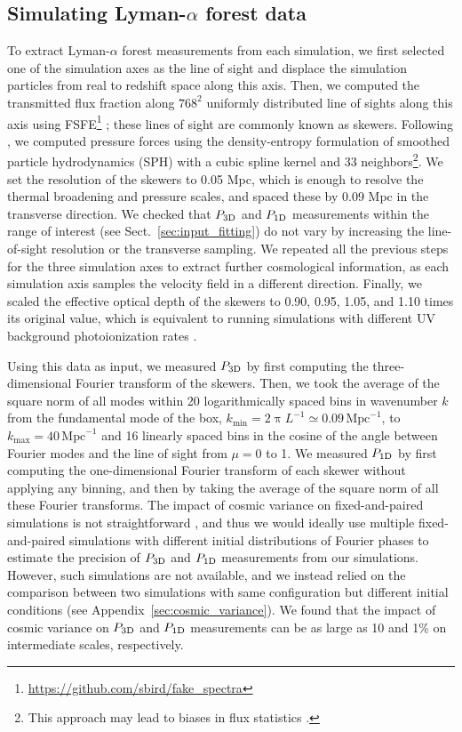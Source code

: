 \documentclass[longauth]{aa}
\newcommand{\lyaf}{Lyman-$\alpha$ forest\xspace}
\newcommand{\poned}{\ensuremath{P_{\rm 1D}}\xspace}
\newcommand{\pthreed}{\ensuremath{P_{\rm 3D}}\xspace}
\newcommand{\iMpc}{\ensuremath{\,\mathrm{Mpc}^{-1}}}
\begin{document}

\subsection{Simulating \lyaf data}
\label{sec:input_extract_lya}

To extract \lyaf measurements from each simulation, we first selected one of the simulation axes as the line of sight and displace the simulation particles from real to redshift space along this axis. Then, we computed the transmitted flux fraction along $768^2$ uniformly distributed line of sights along this axis using \textsc{FSFE}\footnote{\url{https://github.com/sbird/fake_spectra}} \citep{bird2017FSFEFakeSpectra}; these lines of sight are commonly known as skewers. Following \citet{Gadget_Springel}, we computed pressure forces using the density-entropy formulation of smoothed particle hydrodynamics (SPH) with a cubic spline kernel and 33 neighbors\footnote{This approach may lead to biases in flux statistics \citep{hydro_Chabanier2023}.}. We set the resolution of the skewers to 0.05 Mpc, which is enough to resolve the thermal broadening and pressure scales, and spaced these by 0.09 Mpc in the transverse direction. We checked that \pthreed and \poned measurements within the range of interest (see Sect.~\ref{sec:input_fitting}) do not vary by increasing the line-of-sight resolution or the transverse sampling. We repeated all the previous steps for the three simulation axes to extract further cosmological information, as each simulation axis samples the velocity field in a different direction. Finally, we scaled the effective optical depth of the skewers to 0.90, 0.95, 1.05, and 1.10 times its original value, which is equivalent to running simulations with different UV background photoionization rates \citep[see][]{hydro_Lukic2015}.

Using this data as input, we measured \pthreed by first computing the three-dimensional Fourier transform of the skewers. Then, we took the average of the square norm of all modes within 20 logarithmically spaced bins in wavenumber $k$ from the fundamental mode of the box, $k_\mathrm{min}=2\uppi L^{-1} \simeq 0.09\iMpc$, to $k_\mathrm{max}=40\iMpc$ and 16 linearly spaced bins in the cosine of the angle between Fourier modes and the line of sight from $\mu=0$ to 1. We measured \poned by first computing the one-dimensional Fourier transform of each skewer without applying any binning, and then by taking the average of the square norm of all these Fourier transforms. The impact of cosmic variance on fixed-and-paired simulations is not straightforward \citep{maion2022fpvariance}, and thus we would ideally use multiple fixed-and-paired simulations with different initial distributions of Fourier phases to estimate the precision of \pthreed and \poned measurements from our simulations. However, such simulations are not available, and we instead relied on the comparison between two simulations with same configuration but different initial conditions (see Appendix~\ref{sec:cosmic_variance}). We found that the impact of cosmic variance on \pthreed and \poned measurements can be as large as 10 and 1\% on intermediate scales, respectively.
\end{document}
